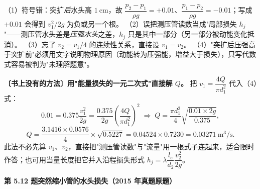 \begin{yicuo}
（1）符号错：突扩\emph{后}水头高 $1\ \mathrm{cm}$，故 $\dfrac{p_2-p_1}{\rho g}=+0.01$、$\dfrac{p_1-p_2}{\rho g}=-0.01$；写成 $+0.01$ 会得到 $v_1^2/2g$ 为负或另一个根。
（2）误把测压管读数当成"局部损失 $h_j$"——测压管水头差是\emph{压强水头}之差，$h_j$ 只是其中一部分（另一部分被动能变化抵消）。
（3）忘了 $v_2=v_1/4$ 的连续性关系，直接设 $v_1=v_2$。
（4）"突扩后压强高于突扩前"必须用文字说明物理原因（动能转为压强能，增益大于损失），只写代数式容易被判为"未理解题意"。
\end{yicuo}
\begin{banfa}
\textbf{〔书上没有的方法〕用"能量损失的一元二次式"直接解 $Q$。} 把 $v_1=\dfrac{4Q}{\pi d_1^2}$ 代入（4）式：
\[0.01=0.375\frac{v_1^2}{2g}=\frac{0.375}{2g}\left(\frac{4Q}{\pi d_1^2}\right)^2
\;\Longrightarrow\;Q=\frac{\pi d_1^2}{4}\sqrt{\frac{0.01\times2g}{0.375}},\]
\[Q=\frac{3.1416\times0.0576}{4}\times\sqrt{0.5227}=0.04524\times0.7230=0.03271\ \mathrm{m^3/s}.\]
此法不必先算 $v_1$、$v_2$，直接把"测压管读数"与"流量"用一根式子连起来，适合限时作答；也可用当量长度把它并入沿程损失形式 $h_j=\lambda\dfrac{l_e}{d_2}\dfrac{v_2^2}{2g}$。
\end{banfa}

\noindent\textbf{第 5.12 题\quad 突然缩小管的水头损失（2015 年真题原题）}

